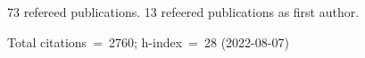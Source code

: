 73 refereed publications. 13 refeered publications as first author.

Total citations~=~2760; h-index~=~28 (2022-08-07)